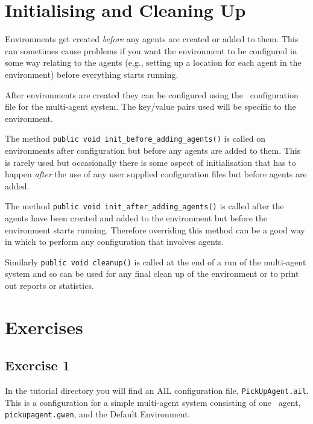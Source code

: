 \section{Initialising and Cleaning Up}
Environments get created \emph{before} any agents are created or added to them.  This can sometimes cause problems if you want the environment to be configured in some way relating to the agents (e.g., setting up a location for each agent in the environment) before everything starts running.

After environments are created they can be configured using the \ail\ configuration file for the multi-agent system.  The key/value pairs used will be specific to the environment.

The method \texttt{public void init\_before\_adding\_agents()} is called on environments after configuration but before any agents are added to them.  This is rarely used but occasionally there is some aspect of initialisation that has to happen \emph{after} the use of any user supplied configuration files but before agents are added.

The method \texttt{public void init\_after\_adding\_agents()} is called after the agents have been created and added to the environment but before the environment starts running.  Therefore overriding this method can be a good way in which to perform any configuration that involves agents.

Similarly \texttt{public void cleanup()} is called at the end of a run of the multi-agent system and so can be used for any final clean up of the environment or to print out reports or statistics.

\section{Exercises}

\subsection{Exercise 1}
\begin{sloppypar}
In the tutorial directory you will find an AIL configuration file, \texttt{PickUpAgent.ail}.  This is a configuration for a simple multi-agent system consisting of one \gwendolen\ agent, \texttt{pickupagent.gwen}, and the Default Environment.
\end{sloppypar}

